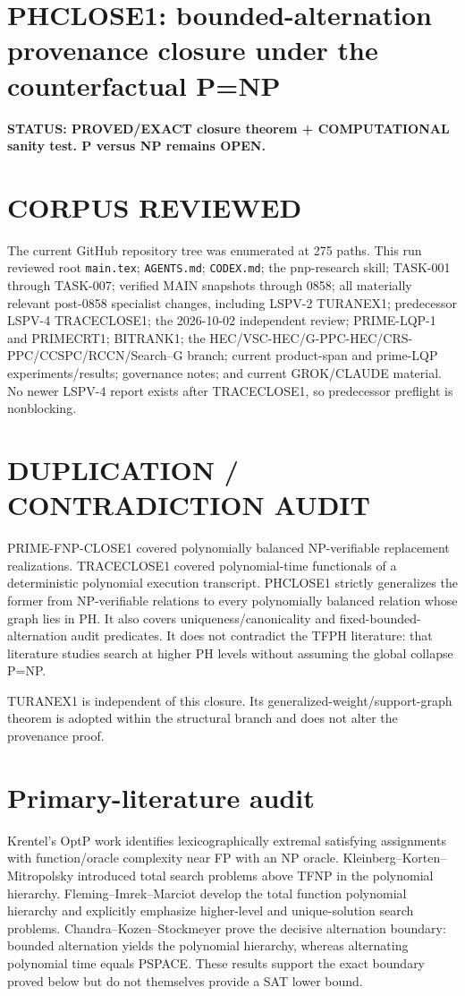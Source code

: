 \documentclass[11pt]{article}
\begin{document}
\section*{PHCLOSE1: bounded-alternation provenance closure under the counterfactual P=NP}

\textbf{STATUS: PROVED/EXACT closure theorem + COMPUTATIONAL sanity test. P versus NP remains OPEN.}

\section*{CORPUS REVIEWED}
The current GitHub repository tree was enumerated at 275 paths. This run reviewed root
\texttt{main.tex}; \texttt{AGENTS.md}; \texttt{CODEX.md}; the pnp-research skill;
TASK-001 through TASK-007; verified MAIN snapshots through 0858; all materially relevant
post-0858 specialist changes, including LSPV-2 TURANEX1; predecessor LSPV-4 TRACECLOSE1;
the 2026-10-02 independent review; PRIME-LQP-1 and PRIMECRT1; BITRANK1; the
HEC/VSC-HEC/G-PPC-HEC/CRS-PPC/CCSPC/RCCN/Search--G branch; current product-span and
prime-LQP experiments/results; governance notes; and current GROK/CLAUDE material.
No newer LSPV-4 report exists after TRACECLOSE1, so predecessor preflight is nonblocking.

\section*{DUPLICATION / CONTRADICTION AUDIT}
PRIME-FNP-CLOSE1 covered polynomially balanced NP-verifiable replacement realizations.
TRACECLOSE1 covered polynomial-time functionals of a deterministic polynomial execution
transcript. PHCLOSE1 strictly generalizes the former from NP-verifiable relations to every
polynomially balanced relation whose graph lies in PH. It also covers uniqueness/canonicality and
fixed-bounded-alternation audit predicates. It does not contradict the TFPH literature: that
literature studies search at higher PH levels without assuming the global collapse P=NP.

TURANEX1 is independent of this closure. Its generalized-weight/support-graph theorem is adopted
within the structural branch and does not alter the provenance proof.

\section*{Primary-literature audit}
Krentel's OptP work identifies lexicographically extremal satisfying assignments with
function/oracle complexity near FP with an NP oracle. Kleinberg--Korten--Mitropolsky introduced
total search problems above TFNP in the polynomial hierarchy. Fleming--Imrek--Marciot develop the
total function polynomial hierarchy and explicitly emphasize higher-level and unique-solution
search problems. Chandra--Kozen--Stockmeyer prove the decisive alternation boundary:
bounded alternation yields the polynomial hierarchy, whereas alternating polynomial time equals
PSPACE. These results support the exact boundary proved below but do not themselves provide a SAT
lower bound.
\end{document}
